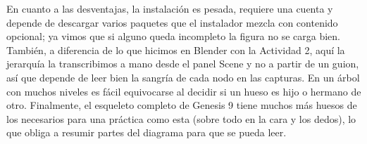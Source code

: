 En cuanto a las desventajas, la instalación es pesada, requiere una cuenta y depende de descargar varios paquetes que el instalador mezcla con contenido opcional; ya vimos que si alguno queda incompleto la figura no se carga bien. También, a diferencia de lo que hicimos en Blender con la Actividad 2, aquí la jerarquía la transcribimos a mano desde el panel Scene y no a partir de un guion, así que depende de leer bien la sangría de cada nodo en las capturas. En un árbol con muchos niveles es fácil equivocarse al decidir si un hueso es hijo o hermano de otro. Finalmente, el esqueleto completo de Genesis 9 tiene muchos más huesos de los necesarios para una práctica como esta (sobre todo en la cara y los dedos), lo que obliga a resumir partes del diagrama para que se pueda leer.
